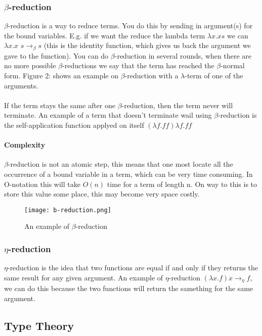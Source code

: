 \subsubsection{$\beta$-reduction}
$\beta$-reduction is a way to reduce terms. You do this by sending in argument(s) for the bound variables. E.g. if we want the reduce the lambda term $\lambda x. x s$ we can $\lambda x. x$  $s \rightarrow _\beta s$ (this is the identity function, which gives us back the argument we gave to the function). You can do $\beta$-reduction in several rounds, when there are no more possible $\beta$-reductions we say that the term has reached the $\beta$-normal form. Figure 2:  shows an example on $\beta$-reduction with a $\lambda$-term of one of the arguments. \\ \\
If the term stays the same after one $\beta$-reduction, then the term never will terminate. An example of a term that doesn't terminate wail using $\beta$-reduction is the self-application function applyed on itself $(\lambda f.ff) \lambda f.ff$

\paragraph{Complexity}
$\beta$-reduction is not an atomic step, this means that one most locate all the occurrence of a bound variable in a term, which can be very time consuming. In O-notation this will take $O(n)$ time for a term of length n. On way to this is to store this value some place, this may become very space costly. 

\begin{figure}
    \centering
    \texttt{[image: b-reduction.png]}
    \caption{An example of $\beta$-reduction}
    \label{fig:beta-reduction}
\end{figure}

\subsubsection{$\eta$-reduction}
$\eta$-reduction is the idea that two functions are equal if and only if they returns the same result for any given argument.
An example of $\eta$-reduction $(\lambda x.f) x \rightarrow_\eta f$, we can do this because the two functions will return the samething
for the same argument.

\subsection{Type Theory}
\label{Type Theory}

